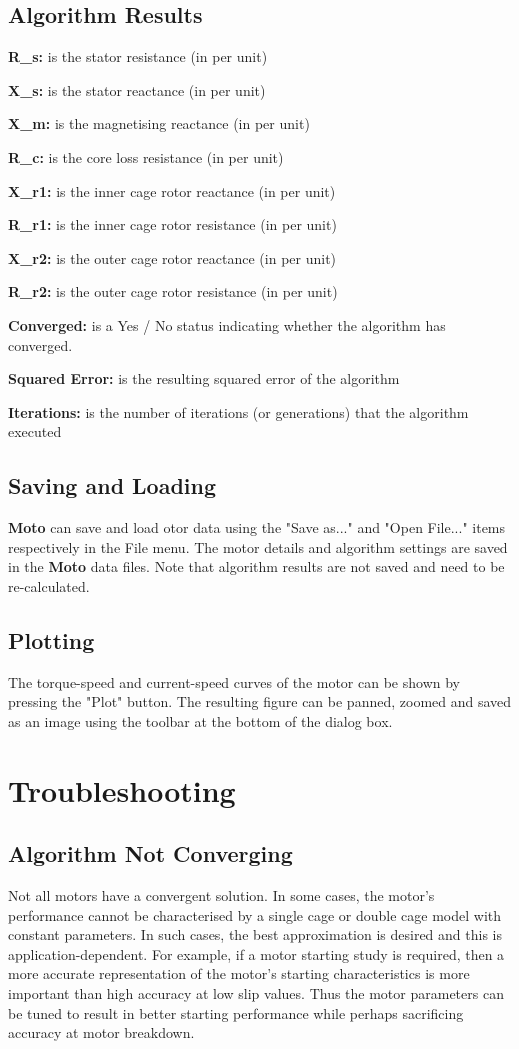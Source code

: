 \documentclass{article}
\begin{document}
\subsection{Algorithm Results}

\textbf{R\_s:} is the stator resistance (in per unit)

\textbf{X\_s:} is the stator reactance (in per unit)

\textbf{X\_m:} is the magnetising reactance (in per unit)

\textbf{R\_c:} is the core loss resistance (in per unit)

\textbf{X\_r1:} is the inner cage rotor reactance (in per unit)

\textbf{R\_r1:} is the inner cage rotor resistance (in per unit)

\textbf{X\_r2:} is the outer cage rotor reactance (in per unit)

\textbf{R\_r2:} is the outer cage rotor resistance (in per unit)

\textbf{Converged:} is a Yes / No status indicating whether the algorithm has converged.

\textbf{Squared Error:} is the resulting squared error of the algorithm

\textbf{Iterations:} is the number of iterations (or generations) that the algorithm executed

\subsection{Saving and Loading}
\textbf{Moto} can save and load otor data using the "Save as..." and "Open File..." items respectively in the File menu. The motor details and algorithm settings are saved in the \textbf{Moto} data files. Note that algorithm results are not saved and need to be re-calculated.

\subsection{Plotting}
The torque-speed and current-speed curves of the motor can be shown by pressing the "Plot" button. The resulting figure can be panned, zoomed and saved as an image using the toolbar at the bottom of the dialog box.

\newpage
\section{Troubleshooting}
\subsection{Algorithm Not Converging}
Not all motors have a convergent solution. In some cases, the motor's performance cannot be characterised by a single cage or double cage model with constant parameters. In such cases, the best approximation is desired and this is application-dependent. For example, if a motor starting study is required, then a more accurate representation of the motor's starting characteristics is more important than high accuracy at low slip values. Thus the motor parameters can be tuned to result in better starting performance while perhaps sacrificing accuracy at motor breakdown. 
\end{document}
